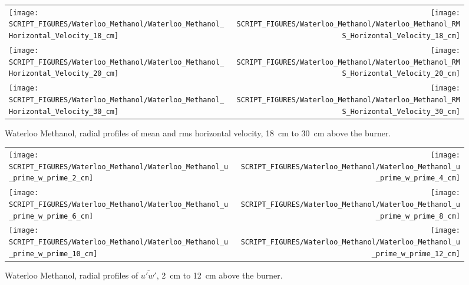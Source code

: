 \begin{figure}[p]
\begin{tabular*}{\textwidth}{l@{\extracolsep{\fill}}r}
\texttt{[image: SCRIPT\_FIGURES/Waterloo\_Methanol/Waterloo\_Methanol\_Horizontal\_Velocity\_18\_cm]} &
\texttt{[image: SCRIPT\_FIGURES/Waterloo\_Methanol/Waterloo\_Methanol\_RMS\_Horizontal\_Velocity\_18\_cm]} \\
\texttt{[image: SCRIPT\_FIGURES/Waterloo\_Methanol/Waterloo\_Methanol\_Horizontal\_Velocity\_20\_cm]} &
\texttt{[image: SCRIPT\_FIGURES/Waterloo\_Methanol/Waterloo\_Methanol\_RMS\_Horizontal\_Velocity\_20\_cm]} \\
\texttt{[image: SCRIPT\_FIGURES/Waterloo\_Methanol/Waterloo\_Methanol\_Horizontal\_Velocity\_30\_cm]} &
\texttt{[image: SCRIPT\_FIGURES/Waterloo\_Methanol/Waterloo\_Methanol\_RMS\_Horizontal\_Velocity\_30\_cm]}
\end{tabular*}
\caption[Waterloo Methanol, radial mean and rms horz.~vel., 18~cm to 30~cm above burner]
{Waterloo Methanol, radial profiles of mean and rms horizontal velocity, 18~cm to 30~cm above the burner.}
\label{Water_Methanol_Hori_Vel_3}
\end{figure}


\begin{figure}[p]
\begin{tabular*}{\textwidth}{l@{\extracolsep{\fill}}r}
\texttt{[image: SCRIPT\_FIGURES/Waterloo\_Methanol/Waterloo\_Methanol\_u\_prime\_w\_prime\_2\_cm]} &
\texttt{[image: SCRIPT\_FIGURES/Waterloo\_Methanol/Waterloo\_Methanol\_u\_prime\_w\_prime\_4\_cm]} \\
\texttt{[image: SCRIPT\_FIGURES/Waterloo\_Methanol/Waterloo\_Methanol\_u\_prime\_w\_prime\_6\_cm]} &
\texttt{[image: SCRIPT\_FIGURES/Waterloo\_Methanol/Waterloo\_Methanol\_u\_prime\_w\_prime\_8\_cm]} \\
\texttt{[image: SCRIPT\_FIGURES/Waterloo\_Methanol/Waterloo\_Methanol\_u\_prime\_w\_prime\_10\_cm]} &
\texttt{[image: SCRIPT\_FIGURES/Waterloo\_Methanol/Waterloo\_Methanol\_u\_prime\_w\_prime\_12\_cm]}
\end{tabular*}
\caption[Waterloo Methanol, radial profiles of $\overline{u'w'}$, 2~cm to 12~cm above the burner]
{Waterloo Methanol, radial profiles of $\overline{u'w'}$, 2~cm to 12~cm above the burner.}
\label{Water_Methanol_upwp_1}
\end{figure}

